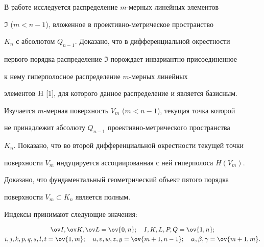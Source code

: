  




\maketitle 


\label{begin} 


 


 


 


В работе исследуется распределение $m$-мерных линейных элементов 


$\Im$ ($m<n-1$), вложенное в проективно-метрическое пространство 


$K_n$ с абсолютом $Q_{n-1}$. Доказано, что в дифференциальной окрестности 


первого порядка распределение $\Im$ порождает инвариантно присоединенное 


к нему гиперполосное распределение $m$-мерных линейных 


элементов $\mathrm H$ [1], для которого данное распределение и является базисным. 


Изучается $m$-мерная поверхность $V_m$ ($m<n-1$), текущая точка которой 


не принадлежит абсолюту $Q_{n-1}$ проективно-метрического пространства 


$K_n$. Показано, что во второй дифференциальной окрестности текущей точки 


поверхности $V_m$ индуцируется ассоциированная с ней гиперполоса $H(V_m)$. 


Доказано, что фундаментальный геометрический объект пятого порядка 


поверхности $V_m\subset K_n$ является полным. 


 


Индексы принимают следующие значения: 


\begin{gather*} 


\ov I,\ov K,\ov L=\ov{0,n};\quad I,K,L,P,Q=\ov{1,n};\\ 


i,j,k,p,q,s,l,t=\ov{1,m};\quad u,v,w,z,y=\ov{m+1,n-1};\quad 


\alpha,\beta,\gamma=\ov{m+1,m}. 


\end{gather*} 


